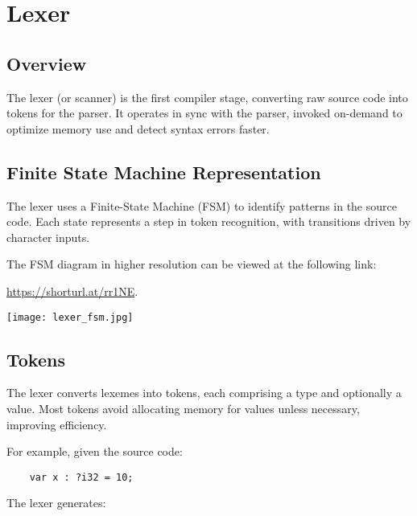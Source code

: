 \documentclass[12pt,a4paper]{article}
\begin{document}
\section{Lexer\cite{lexer}}

\subsection{Overview}
The lexer (or scanner) is the first compiler stage, converting raw source code into tokens for the parser. It operates in sync with the parser, invoked on-demand to optimize memory use and detect syntax errors faster.

\subsection{Finite State Machine Representation}
The lexer uses a Finite-State Machine (FSM) to identify patterns in the source code. Each state represents a step in token recognition, with transitions driven by character inputs.

The FSM diagram in higher resolution can be viewed at the following link:  

\href{https://shorturl.at/rr1NE}{https://shorturl.at/rr1NE}.

\begin{center}
    \texttt{[image: lexer\_fsm.jpg]} %
\end{center}

\subsection{Tokens}
The lexer converts lexemes into tokens, each comprising a type and optionally a value. Most tokens avoid allocating memory for values unless necessary, improving efficiency.

For example, given the source code:
\begin{verbatim}
    var x : ?i32 = 10;
\end{verbatim}

The lexer generates:
\end{document}
